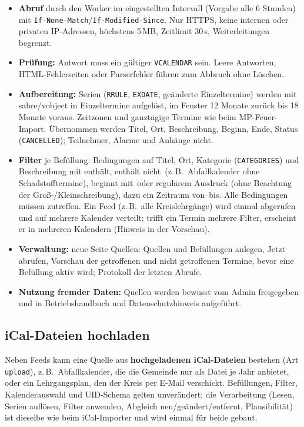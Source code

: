 \documentclass[a4paper,fontsize=10pt]{scrartcl}
\newcommand{\code}[1]{\texttt{#1}}
\begin{document}
\begin{itemize}
  \item \textbf{Abruf} durch den Worker im eingestellten Intervall (Vorgabe
        alle 6 Stunden) mit \code{If-None-Match}/\code{If-Modified-Since}.
        Nur HTTPS, keine internen oder privaten IP-Adressen, höchstens
        5\,MB, Zeitlimit 30\,s, Weiterleitungen begrenzt.
  \item \textbf{Prüfung:} Antwort muss ein gültiger \code{VCALENDAR} sein.
        Leere Antworten, HTML-Fehlerseiten oder Parserfehler führen zum
        Abbruch ohne Löschen.
  \item \textbf{Aufbereitung:} Serien (\code{RRULE}, \code{EXDATE},
        geänderte Einzeltermine) werden mit sabre/vobject in Einzeltermine
        aufgelöst, im Fenster 12 Monate zurück bis 18 Monate voraus.
        Zeitzonen und ganztägige Termine wie beim MP-Feuer-Import.
        Übernommen werden Titel, Ort, Beschreibung, Beginn, Ende, Status
        (\code{CANCELLED}); Teilnehmer, Alarme und Anhänge nicht.
  \item \textbf{Filter} je Befüllung: Bedingungen auf Titel, Ort, Kategorie
        (\code{CATEGORIES}) und Beschreibung mit \glqq enthält\grqq,
        \glqq enthält nicht\grqq\ (z.\,B.\ Abfallkalender ohne Schadstofftermine),
        \glqq beginnt mit\grqq\ oder regulärem Ausdruck (ohne Beachtung der
        Groß-/Kleinschreibung), dazu ein Zeitraum von--bis. Alle
        Bedingungen müssen zutreffen. Ein Feed (z.\,B.\ alle
        Kreislehrgänge) wird einmal abgerufen und auf mehrere Kalender
        verteilt; trifft ein Termin mehrere Filter, erscheint er in mehreren
        Kalendern (Hinweis in der Vorschau).
  \item \textbf{Verwaltung:} neue Seite \glqq Quellen\grqq: Quellen und
        Befüllungen anlegen, \glqq Jetzt abrufen\grqq, Vorschau der
        getroffenen und nicht getroffenen Termine, bevor eine Befüllung
        aktiv wird; Protokoll der letzten Abrufe.
  \item \textbf{Nutzung fremder Daten:} Quellen werden bewusst vom Admin
        freigegeben und in Betriebshandbuch und Datenschutzhinweis
        aufgeführt.
\end{itemize}

\subsection{iCal-Dateien hochladen}\label{sec:quellen-upload}

Neben Feeds kann eine Quelle aus \textbf{hochgeladenen iCal-Dateien}
bestehen (Art \code{upload}), z.\,B.\ Abfallkalender, die die Gemeinde nur
als Datei je Jahr anbietet, oder ein Lehrgangsplan, den der Kreis per E-Mail
verschickt. Befüllungen, Filter, Kalenderauswahl und UID-Schema gelten
unverändert; die Verarbeitung (Lesen, Serien auflösen, Filter anwenden,
Abgleich neu/geändert/entfernt, Plausibilität) ist dieselbe wie beim
iCal-Importer und wird einmal für beide gebaut.
\end{document}
